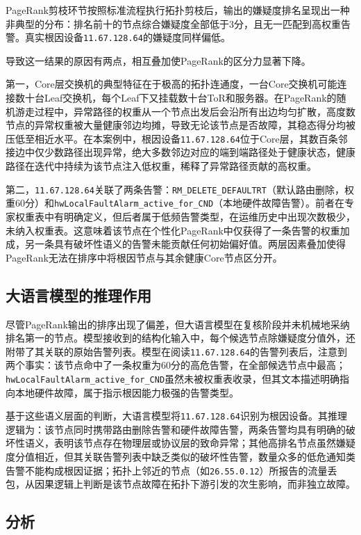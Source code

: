 PageRank剪枝环节按照标准流程执行拓扑剪枝后，输出的嫌疑度排名呈现出一种非典型的分布：排名前十的节点综合嫌疑度全部低于3分，且无一匹配到高权重告警。真实根因设备\texttt{11.67.128.64}的嫌疑度同样偏低。

导致这一结果的原因有两点，相互叠加使PageRank的区分力显著下降。

第一，Core层交换机的典型特征在于极高的拓扑连通度，一台Core交换机可能连接数十台Leaf交换机，每个Leaf下又挂载数十台ToR和服务器。在PageRank的随机游走过程中，异常路径的权重从一个节点出发后会沿所有出边均匀扩散，高度数节点的异常权重被大量健康邻边均摊，导致无论该节点是否故障，其稳态得分均被压低至相近水平。在本案例中，根因设备\texttt{11.67.128.64}位于Core层，其数百条邻接边中仅少数路径出现异常，绝大多数邻边对应的端到端路径处于健康状态，健康路径在迭代中持续为该节点注入低权重，稀释了异常路径贡献的高权重。

第二，\texttt{11.67.128.64}关联了两条告警：\texttt{RM\_DELETE\_DEFAULTRT}（默认路由删除，权重60分）和\texttt{hwLocalFaultAlarm\_active\_for\_CND}（本地硬件故障告警）。前者在专家权重表中有明确定义，但后者属于低频告警类型，在运维历史中出现次数极少，未纳入权重表。这意味着该节点在个性化PageRank中仅获得了一条告警的权重加成，另一条具有破坏性语义的告警未能贡献任何初始偏好值。两层因素叠加使得PageRank无法在排序中将根因节点与其余健康Core节点区分开。

\subsection{大语言模型的推理作用}

尽管PageRank输出的排序出现了偏差，但大语言模型在复核阶段并未机械地采纳排名第一的节点。模型接收到的结构化输入中，每个候选节点除嫌疑度分值外，还附带了其关联的原始告警列表。模型在阅读\texttt{11.67.128.64}的告警列表后，注意到两个事实：该节点命中了一条权重为60分的高危告警，在全部候选节点中最高；\texttt{hwLocalFaultAlarm\_active\_for\_CND}虽然未被权重表收录，但其文本描述明确指向本地硬件故障，属于指示根因能力极强的告警类型。

基于这些语义层面的判断，大语言模型将\texttt{11.67.128.64}识别为根因设备。其推理逻辑为：该节点同时携带路由删除告警和硬件故障告警，两条告警均具有明确的破坏性语义，表明该节点存在物理层或协议层的致命异常；其他高排名节点虽然嫌疑度分值相近，但其关联告警列表中缺乏类似的破坏性告警，数量众多的低危通知类告警不能构成根因证据；拓扑上邻近的节点（如\texttt{26.55.0.12}）所报告的流量丢包，从因果逻辑上判断是该节点故障在拓扑下游引发的次生影响，而非独立故障。

\subsection{分析}

